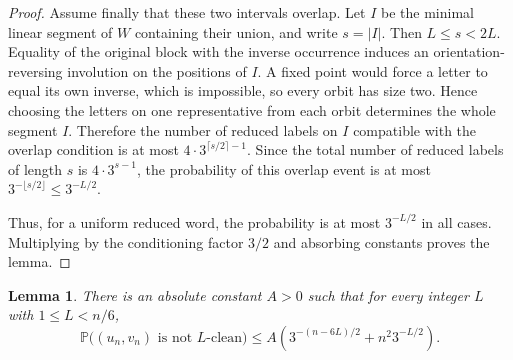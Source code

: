 \documentclass{amsproc}
\newtheorem{lemma}[theorem]{Lemma}
\newcommand{\Prob}{\mathbb P}
\begin{document}
\begin{proof}
Assume finally that these two intervals overlap.  Let $I$ be the minimal linear
segment of $W$ containing their union, and write $s=|I|$.  Then $L\leq s<2L$.
Equality of the original block with the inverse occurrence induces an
orientation-reversing involution on the positions of $I$.  A fixed point would
force a letter to equal its own inverse, which is impossible, so every orbit has
size two.  Hence choosing the letters on one representative from each orbit
determines the whole segment $I$.  Therefore the number of reduced labels on $I$
compatible with the overlap condition is at most
$
        4\cdot 3^{\lceil s/2\rceil-1}.
$
Since the total number of reduced labels of length $s$ is $4\cdot 3^{s-1}$, the
probability of this overlap event is at most
$
        3^{-\lfloor s/2\rfloor}\leq 3^{-L/2}.
$

Thus, for a uniform reduced word, the probability is at most $3^{-L/2}$ in all
cases.  Multiplying by the conditioning factor $3/2$ and absorbing constants
proves the lemma.
\end{proof}

\begin{lemma}
There is an absolute constant $A>0$ such that for every integer $L$ with
$1\leq L<n/6$,
\[
        \Prob\bigl((u_n,v_n)\text{ is not }L\text{-clean}\bigr)
        \leq A\left(3^{-(n-6L)/2}+n^2 3^{-L/2}\right).
\]
\end{lemma}
\end{document}
